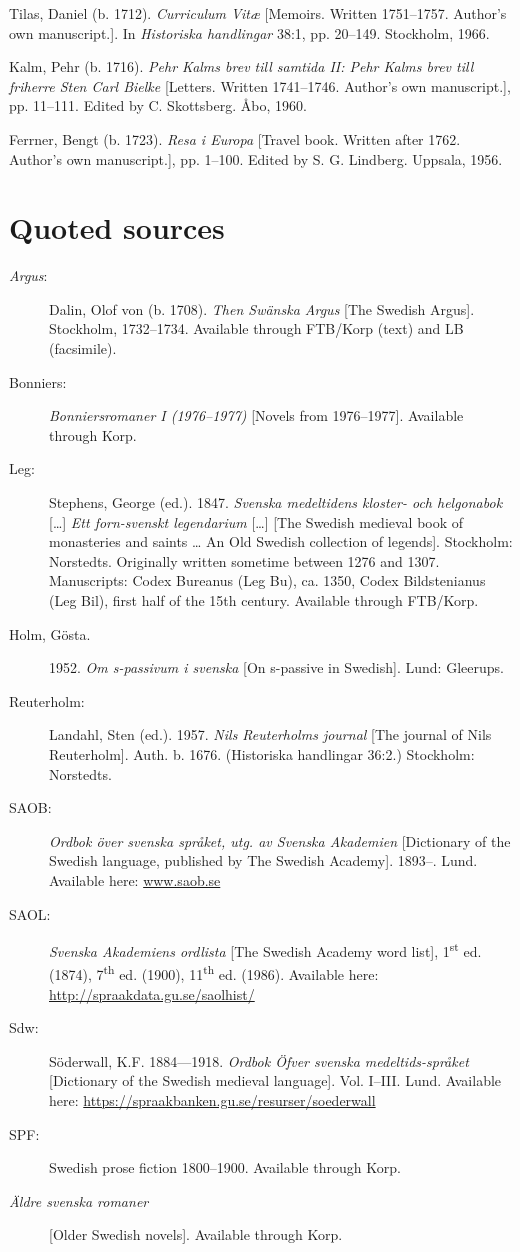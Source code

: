 \documentclass[output=paper]{langscibook}
\begin{document}
Tilas, Daniel (b. 1712). \textit{Curriculum Vitæ} [Memoirs. Written 1751–1757. Author’s own manuscript.]. In \textit{Historiska handlingar} 38:1, pp. 20–149. Stockholm, 1966.



Kalm, Pehr (b. 1716). \textit{Pehr Kalms brev till samtida II: Pehr Kalms brev till friherre Sten Carl Bielke} [Letters. Written 1741–1746. Author’s own manuscript.], pp. 11–111. Edited by C. Skottsberg. Åbo, 1960.



Ferrner, Bengt (b. 1723). \textit{Resa i Europa} [Travel book. Written after 1762. Author’s own manuscript.], pp. 1–100. Edited by S. G. Lindberg. Uppsala, 1956.


\section*{Quoted sources}\sloppy
\begin{description}
\item[\textit{Argus}:] Dalin, Olof von (b. 1708). \textit{Then Swänska Argus} [The Swedish Argus]. Stockholm, 1732–1734. Available through FTB/Korp (text) and LB (facsimile).
\item[Bonniers:] \textit{Bonniersromaner I (1976–1977)} [Novels from 1976–1977]. Available through Korp.
\item[Leg:] Stephens, George (ed.). 1847. \textit{Svenska medeltidens kloster- och helgonabok} […] \textit{Ett forn-svenskt legendarium} […] [The Swedish medieval book of monasteries and saints … An Old Swedish collection of legends]. Stockholm: Norstedts. Originally written sometime between 1276 and 1307. Manuscripts: Codex Bureanus (Leg Bu), ca. 1350, Codex Bildstenianus (Leg Bil), first half of the 15th century. Available through FTB/Korp.
\item[\normalfont Holm, Gösta.] 1952. \textit{Om s-passivum i svenska} [On s-passive in Swedish]. Lund: Gleerups.
\item[Reuterholm:] Landahl, Sten (ed.). 1957. \textit{Nils Reuterholms journal} [The journal of Nils Reuterholm]. Auth. b. 1676. (Historiska handlingar 36:2.) Stockholm: Norstedts.
\item[SAOB:] \textit{Ordbok över svenska språket, utg. av Svenska Akademien} [Dictionary of the Swedish language, published by The Swedish Academy]. 1893–. Lund. Available here: \href{http://www.saob.se}{{www.saob.se}} 
\item[SAOL:] \textit{Svenska Akademiens ordlista} [The Swedish Academy word list], 1\textsuperscript{st} ed. (1874), 7\textsuperscript{th} ed. (1900), 11\textsuperscript{th} ed. (1986). Available here: \url{http://spraakdata.gu.se/saolhist/}
\item[Sdw:] Söderwall, K.F. 1884—1918. \textit{Ordbok Öfver svenska medeltids-språket} [Dictionary of the Swedish medieval language]. Vol. I–III. Lund. Available here: \url{https://spraakbanken.gu.se/resurser/soederwall} 
\item[SPF:] Swedish prose fiction 1800–1900. Available through Korp. 
\item[\textit{Äldre svenska romaner}] [Older Swedish novels]. Available through Korp. 
\end{description}
\end{document}
